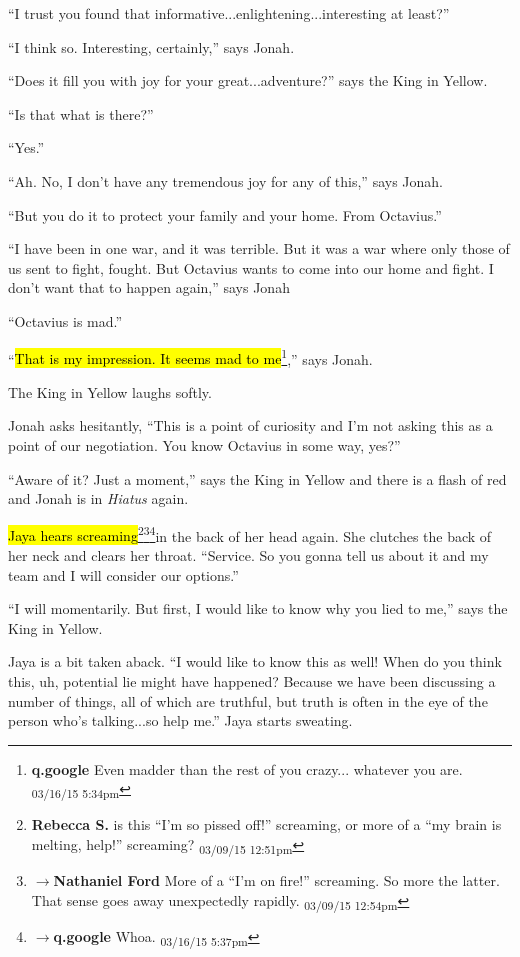 ``I trust you found that informative...enlightening...interesting at least?''

``I think so.  Interesting, certainly,'' says Jonah.

``Does it fill you with joy for your great...adventure?'' says the King in Yellow.

``Is that what is there?''

``Yes.''

``Ah.  No, I don't have any tremendous joy for any of this,'' says Jonah.

``But you do it to protect your family and your home.  From Octavius.''

``I have been in one war, and it was terrible.  But it was a war where only those of us sent to fight, fought.  But Octavius wants to come into our home and fight.  I don't want that to happen again,'' says Jonah

``Octavius is mad.''

``\hl{That is my impression.  It seems mad to me}\footnote{\textbf{q.google }Even madder than the rest of you crazy... whatever you are. \textsubscript{03/16/15 5:34pm}},'' says Jonah.

The King in Yellow laughs softly.

Jonah asks hesitantly, ``This is a point of curiosity and I'm not asking this as a point of our negotiation.  You know Octavius in some way, yes?''

``Aware of it?  Just a moment,'' says the King in Yellow and there is a flash of red and Jonah is in \textit{Hiatus} again.





\hl{Jaya hears screaming}\footnote{\textbf{Rebecca S. }is this ``I'm so pissed off!'' screaming, or more of a ``my brain is melting, help!'' screaming? \textsubscript{03/09/15 12:51pm}}\footnote{$\rightarrow$\textbf{Nathaniel Ford }More of a ``I'm on fire!'' screaming. So more the latter. That sense goes away unexpectedly rapidly. \textsubscript{03/09/15 12:54pm}}\footnote{$\rightarrow$\textbf{q.google }Whoa. \textsubscript{03/16/15 5:37pm}}in the back of her head again.  She clutches the back of her neck and clears her throat. ``Service.  So you gonna tell us about it and my team and I will consider our options.''

``I will momentarily.  But first, I would like to know why you lied to me,'' says the King in Yellow.

Jaya is a bit taken aback.  ``I would like to know this as well!  When do you think this, uh, potential lie might have happened?  Because we have been discussing a number of things, all of which are truthful, but truth is often in the eye of the person who's talking...so help me.''  Jaya starts sweating.

